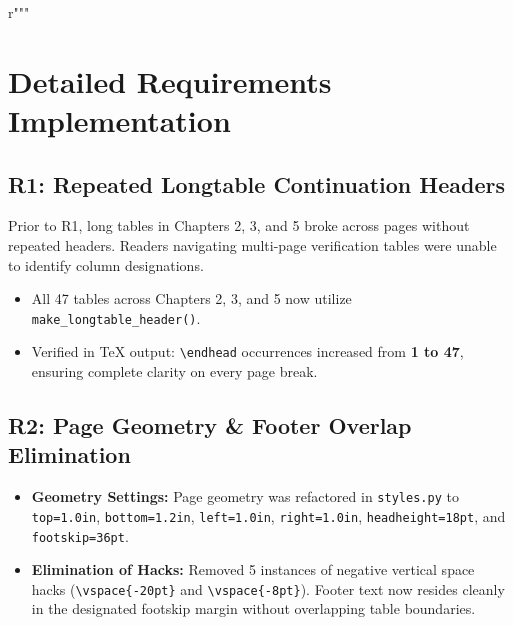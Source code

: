 r"""\documentclass[11pt,a4paper]{article}
\begin{document}
\section{Detailed Requirements Implementation}

\subsection{R1: Repeated Longtable Continuation Headers}
Prior to R1, long tables in Chapters 2, 3, and 5 broke across pages without repeated headers. Readers navigating multi-page verification tables were unable to identify column designations.
\begin{itemize}
    \item All 47 tables across Chapters 2, 3, and 5 now utilize \texttt{make\_longtable\_header()}.
    \item Verified in TeX output: \texttt{\textbackslash endhead} occurrences increased from \textbf{1 to 47}, ensuring complete clarity on every page break.
\end{itemize}

\subsection{R2: Page Geometry \& Footer Overlap Elimination}
\begin{itemize}
    \item \textbf{Geometry Settings:} Page geometry was refactored in \texttt{styles.py} to \texttt{top=1.0in}, \texttt{bottom=1.2in}, \texttt{left=1.0in}, \texttt{right=1.0in}, \texttt{headheight=18pt}, and \texttt{footskip=36pt}.
    \item \textbf{Elimination of Hacks:} Removed 5 instances of negative vertical space hacks (\texttt{\textbackslash vspace\{-20pt\}} and \texttt{\textbackslash vspace\{-8pt\}}). Footer text now resides cleanly in the designated footskip margin without overlapping table boundaries.
\end{itemize}
\end{document}
